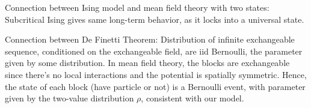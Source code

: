 Connection between Ising model and mean field theory with two states: Subcritical Ising gives same long-term behavior, as it locks into a universal state.

Connection between De Finetti Theorem: Distribution of infinite exchangeable sequence, conditioned on the exchangeable field, are iid Bernoulli, the parameter given by some distribution.
In mean field theory, the blocks are exchangeable since there's no local interactions and the potential is spatially symmetric. Hence, the state of each block (have particle or not) is a Bernoulli event, with parameter given by the two-value distribution $\rho$, consistent with our model.

